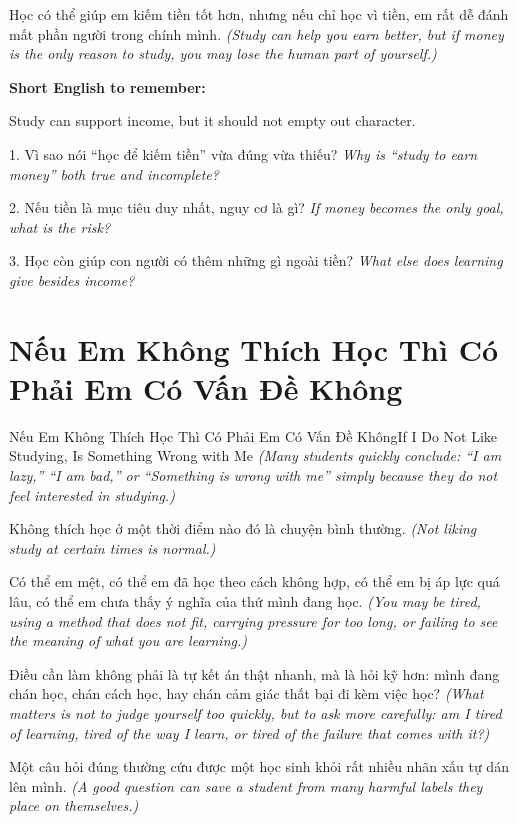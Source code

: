 \begin{baihoc}
Học có thể giúp em kiếm tiền tốt hơn, nhưng nếu chỉ học vì tiền, em rất dễ đánh mất phần người trong chính mình.
\textit{(Study can help you earn better, but if money is the only reason to study, you may lose the human part of yourself.)}
\end{baihoc}

\begin{ghinhoanh}
\textbf{Short English to remember:}

Study can support income, but it should not empty out character.

\end{ghinhoanh}

\begin{tuhocnhanh}
1. Vì sao nói “học để kiếm tiền” vừa đúng vừa thiếu? \textit{Why is “study to earn money” both true and incomplete?}

2. Nếu tiền là mục tiêu duy nhất, nguy cơ là gì? \textit{If money becomes the only goal, what is the risk?}

3. Học còn giúp con người có thêm những gì ngoài tiền? \textit{What else does learning give besides income?}
\end{tuhocnhanh}
\ngancach

\section{Nếu Em Không Thích Học Thì Có Phải Em Có Vấn Đề Không}
\begin{truyen}{Nếu Em Không Thích Học Thì Có Phải Em Có Vấn Đề Không}{If I Do Not Like Studying, Is Something Wrong with Me}
\textit{(Many students quickly conclude: “I am lazy,” “I am bad,” or “Something is wrong with me” simply because they do not feel interested in studying.)}

Không thích học ở một thời điểm nào đó là chuyện bình thường.
\textit{(Not liking study at certain times is normal.)}

Có thể em mệt, có thể em đã học theo cách không hợp, có thể em bị áp lực quá lâu, có thể em chưa thấy ý nghĩa của thứ mình đang học.
\textit{(You may be tired, using a method that does not fit, carrying pressure for too long, or failing to see the meaning of what you are learning.)}

Điều cần làm không phải là tự kết án thật nhanh, mà là hỏi kỹ hơn: mình đang chán học, chán cách học, hay chán cảm giác thất bại đi kèm việc học?
\textit{(What matters is not to judge yourself too quickly, but to ask more carefully: am I tired of learning, tired of the way I learn, or tired of the failure that comes with it?)}

Một câu hỏi đúng thường cứu được một học sinh khỏi rất nhiều nhãn xấu tự dán lên mình.
\textit{(A good question can save a student from many harmful labels they place on themselves.)}
\end{truyen}

